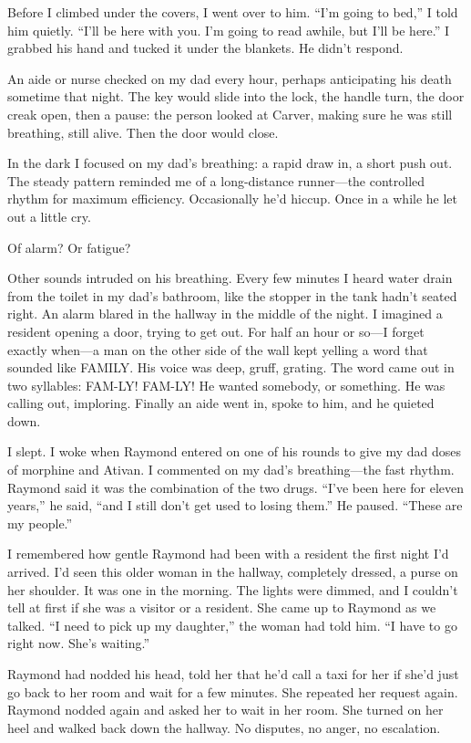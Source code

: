 \documentclass[12pt]{book}
\begin{document}
Before I climbed under the covers, I went over to him. ``I'm going to bed,'' I told him quietly. ``I'll be here with you. I'm going to read awhile, but I'll be here.'' I grabbed his hand and tucked it under the blankets. He didn't respond.

An aide or nurse checked on my dad every hour, perhaps anticipating his death sometime that night. The key would slide into the lock, the handle turn, the door creak open, then a pause: the person looked at Carver, making sure he was still breathing, still alive. Then the door would close.

In the dark I focused on my dad's breathing: a rapid draw in, a short push out. The steady pattern reminded me of a long-distance runner---the controlled rhythm for maximum efficiency. Occasionally he'd hiccup. Once in a while he let out a little cry.

Of alarm? Or fatigue?

Other sounds intruded on his breathing. Every few minutes I heard water drain from the toilet in my dad's bathroom, like the stopper in the tank hadn't seated right. An alarm blared in the hallway in the middle of the night. I imagined a resident opening a door, trying to get out. For half an hour or so---I forget exactly when---a man on the other side of the wall kept yelling a word that sounded like FAMILY. His voice was deep, gruff, grating. The word came out in two syllables: FAM-LY! FAM-LY! He wanted somebody, or something. He was calling out, imploring. Finally an aide went in, spoke to him, and he quieted down.

I slept. I woke when Raymond entered on one of his rounds to give my dad doses of morphine and Ativan. I commented on my dad's breathing---the fast rhythm. Raymond said it was the combination of the two drugs. ``I've been here for eleven years,'' he said, ``and I still don't get used to losing them.'' He paused. ``These are my people.''

I remembered how gentle Raymond had been with a resident the first night I'd arrived. I'd seen this older woman in the hallway, completely dressed, a purse on her shoulder. It was one in the morning. The lights were dimmed, and I couldn't tell at first if she was a visitor or a resident. She came up to Raymond as we talked. ``I need to pick up my daughter,'' the woman had told him. ``I have to go right now. She's waiting.''

Raymond had nodded his head, told her that he'd call a taxi for her if she'd just go back to her room and wait for a few minutes. She repeated her request again. Raymond nodded again and asked her to wait in her room. She turned on her heel and walked back down the hallway. No disputes, no anger, no escalation.
\end{document}
